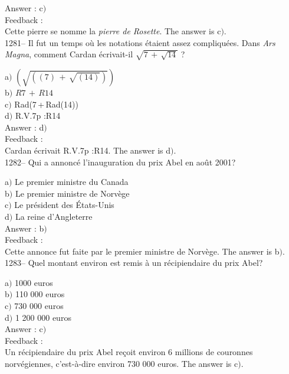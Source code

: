 ﻿\documentclass[letterpaper, 12pt]{article}
\begin{document}
Answer : c$)$\\

Feedback : \\
Cette pierre se nomme la {\sl pierre de Rosette}.
The answer is  c$)$.\\

1281-- Il fut un temps o\`u les notations \'etaient assez
compliqu\'ees. Dans {\sl Ars Magna}, comment Cardan \'ecrivait-il
$\sqrt{7\,+\,\sqrt{14}}$ ?

a$)$ $(\sqrt{((7)\,+\,\sqrt{(14)})})$ \\[2mm]
b$)$ $R7\,+\,R14$ \\[2mm]
c$)$ Rad(7\,+\,Rad(14)) \\[2mm]
d$)$ R.V.7p :R14\\

Answer : d$)$\\

Feedback : \\
Cardan \'ecrivait R.V.7p :R14.
The answer is  d$)$.\\

1282-- Qui a annonc\'e l'inauguration du prix Abel en ao\^ut 2001?

a$)$ Le premier ministre du Canada \\
b$)$ Le premier ministre de Norv\`ege \\
c$)$ Le pr\'esident des \'Etats-Unis \\
d$)$ La reine d'Angleterre\\

Answer : b$)$\\

Feedback : \\
Cette annonce fut faite par le premier ministre de Norv\`ege.
The answer is  b$)$.\\

1283-- Quel montant environ est remis \`a un r\'ecipiendaire du prix
Abel?

a$)$ 1000 euros \\
b$)$ 110 000 euros \\
c$)$ 730 000 euros \\
d$)$ 1 200 000 euros\\

Answer : c$)$\\

Feedback : \\
Un r\'ecipiendaire du prix Abel re\c coit environ 6 millions de
couronnes norv\'egiennes,  c'est-\`a-dire environ 730 000 euros.
The answer is  c$)$.\\
\end{document}
